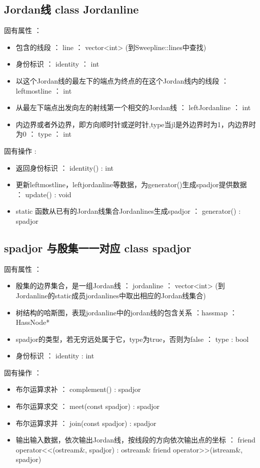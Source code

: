 \documentclass[a4paper]{book}
\numberwithin{equation}{chapter}
\theoremstyle{definition}
\begin{document}
\subsection{Jordan线 class Jordanline}
固有属性 ：
\begin{itemize}
	\item  包含的线段 ： line ： vector<int>  (到Sweepline::lines中查找)
	\item  身份标识 ： identity ： int 
	\item  以这个Jordan线的最左下的端点为终点的在这个Jordan线内的线段 ： leftmostline ： int
	\item  从最左下端点出发向左的射线第一个相交的Jordan线 ： leftJordanline ： int
	\item  内边界或者外边界，即方向顺时针或逆时针,type当jl是外边界时为1，内边界时为0 ： type ： int
\end{itemize}
固有操作 :
\begin{itemize}
	\item  返回身份标识 ： identity() : int
	\item  更新leftmostline，leftjordanline等数据，为generator()生成spadjor提供数据 ： update() : void
	\item  static 函数从已有的Jordan线集合Jordanlines生成spadjor ： generator() : spadjor 
\end{itemize}
\subsection{spadjor 与殷集一一对应 class spadjor}
固有属性 ：
\begin{itemize}
	\item  殷集的边界集合，是一组Jordan线 ： jordanline ： vector<int> (到Jordanline的static成员jordanlines中取出相应的Jordan线集合)
	\item  树结构的哈斯图，表现jordanline中的jordan线的包含关系 ：hassmap ： HassNode* 
	\item  spadjor的类型，若无穷远处属于它，type为true，否则为false ： type : bool
	\item  身份标识 ： identity : int
\end{itemize}
固有操作 ：
\begin{itemize}
	\item  布尔运算求补 ： complement() : spadjor
	\item  布尔运算求交 ： meet(const spadjor) : spadjor
	\item  布尔运算求并 ： join(const spadjor) : spadjor
	\item  输出输入数据，依次输出Jordan线，按线段的方向依次输出点的坐标 ： friend operator<<(ostream\&, spadjor) : ostream\&  friend operator>>(istream\&, spadjor)
\end{itemize}
\end{document}

